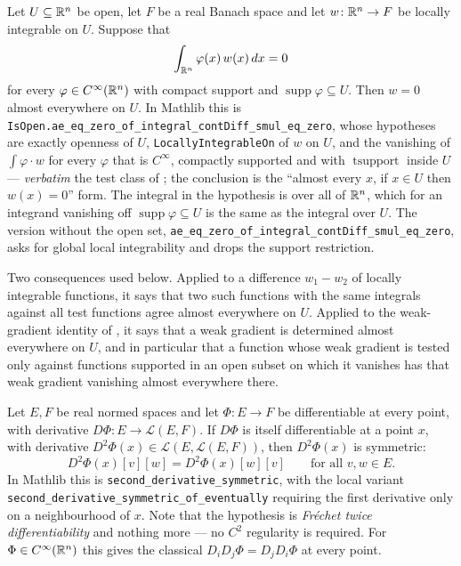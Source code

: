 \begin{proposition}
Let $U\subseteq\mathbb{R}^n$ be open, let $F$ be a real Banach space and let
$w\colon\mathbb{R}^n\to F$ be locally integrable on $U$.  Suppose that
\[
\int_{\mathbb{R}^n}\varphi(x)\,w(x)\,dx=0
\]
for every $\varphi\in C^\infty(\mathbb{R}^n)$ with compact support and
$\operatorname{supp}\varphi\subseteq U$.  Then $w=0$ almost everywhere on $U$.
In Mathlib this is
\texttt{IsOpen.ae\_eq\_zero\_of\_integral\_contDiff\_smul\_eq\_zero}, whose
hypotheses are exactly openness of $U$, \texttt{LocallyIntegrableOn} of $w$ on
$U$, and the vanishing of $\int\varphi\cdot w$ for every $\varphi$ that is
$C^\infty$, compactly supported and with $\operatorname{tsupport}$ inside $U$ ---
\emph{verbatim} the test class of ; the conclusion is
the ``almost every $x$, if $x\in U$ then $w(x)=0$'' form.  The integral in the
hypothesis is over all of $\mathbb{R}^n$, which for an integrand vanishing off
$\operatorname{supp}\varphi\subseteq U$ is the same as the integral over $U$.
The version without the open set, \texttt{ae\_eq\_zero\_of\_integral\_contDiff\_smul\_eq\_zero},
asks for global local integrability and drops the support restriction.

Two consequences used below.  Applied to a difference $w_1-w_2$ of locally
integrable functions, it says that two such functions with the same integrals
against all test functions agree almost everywhere on $U$.  Applied to the
weak-gradient identity of , it says that a weak
gradient is determined almost everywhere on $U$, and in particular that a
function whose weak gradient is tested only against functions supported in an
open subset on which it vanishes has that weak gradient vanishing almost
everywhere there.
\end{proposition}

\begin{proposition}
Let $E,F$ be real normed spaces and let $\Phi\colon E\to F$ be differentiable at
every point, with derivative $D\Phi\colon E\to\mathcal L(E,F)$.  If $D\Phi$ is
itself differentiable at a point $x$, with derivative
$D^2\Phi(x)\in\mathcal L(E,\mathcal L(E,F))$, then $D^2\Phi(x)$ is symmetric:
\[
D^2\Phi(x)[v][w]=D^2\Phi(x)[w][v]\qquad\text{for all }v,w\in E .
\]
In Mathlib this is \texttt{second\_derivative\_symmetric}, with the local variant
\texttt{second\_derivative\_symmetric\_of\_eventually} requiring the first
derivative only on a neighbourhood of $x$.  Note that the hypothesis is
\emph{Fr\'echet twice differentiability} and nothing more --- no $C^2$
regularity is required.  For $\Phi\in C^\infty(\mathbb{R}^n)$ this gives the classical
$D_iD_j\Phi=D_jD_i\Phi$ at every point.
\end{proposition}

